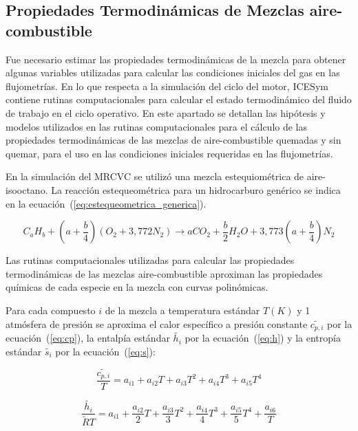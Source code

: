 \subsection{Propiedades Termodinámicas de Mezclas aire-combustible}\label{subsec:prop_mezcla}
%
Fue necesario estimar las propiedades termodinámicas de la mezcla para obtener
algunas variables utilizadas para calcular las condiciones iniciales del gas en
las flujometrías.
%
En lo que respecta a la simulación del ciclo del motor, ICESym contiene rutinas
computacionales para calcular el estado termodinámico del fluido de trabajo en
el ciclo operativo.
%
En este apartado se detallan las hipótesis y modelos utilizados en las rutinas
computacionales para el cálculo de las propiedades termodinámicas de las mezclas
de aire-combustible quemadas y sin quemar, para el uso en las condiciones
iniciales requeridas en las flujometrías.

En la simulación del MRCVC se utilizó una mezcla estequiométrica de
aire-isooctano.
%
La reacción estequeométrica para un hidrocarburo genérico se indica en la
ecuación~(\ref{eq:estequeometrica_generica}).

\begin{equation} \label{eq:estequeometrica_generica}
  C_{a}H_{b} + \left(a + \frac{b}{4}\right) \left(O_{2}+3,772N_{2}\right) \rightarrow a CO_{2} + \frac{b}{2} H_{2}O + 3,773 \left(a + \frac{b}{4}\right) N_{2}
\end{equation}

Las rutinas computacionales utilizadas para calcular las propiedades
termodinámicas de las mezclas aire-combustible aproximan las propiedades
químicas de cada especie en la mezcla con curvas polinómicas.

Para cada compuesto $i$ de la mezcla a temperatura estándar $T(K)$ y 1 atmósfera
de presión se aproxima el calor específico a presión constante
$\widetilde{c_{p,i}}$ por la ecuación~(\ref{eq:cp}), la entalpía estándar
$\widetilde{h_{i}}$ por la ecuación~(\ref{eq:h}) y la entropía estándar
$\widetilde{s_{i}}$ por la ecuación~(\ref{eq:s}):


\begin{equation}\label{eq:cp} \frac{\widetilde{c_{p,i}}}{T} = a_{i1} + a_{i2}T + a_{i3}T^{2} + a_{i4}T^{3} + a_{i5}T^{4}
\end{equation}

\begin{equation}\label{eq:h} \frac{\widetilde{h_{i}}}{\widetilde{R}T} = a_{i1} + \frac{a_{i2}}{2}T + \frac{a_{i3}}{3}T^{2} + \frac{a_{i4}}{4}T^{3} + \frac{a_{i5}}{5}T^{4} +\frac{a_{i6}}{T}
\end{equation}

